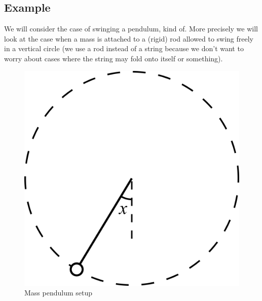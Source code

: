 \subsection{Example}
We will consider the case of swinging a pendulum, kind of. More precisely we will look at the case when a mass is attached to a (rigid) rod allowed to swing freely in a vertical circle (we use a rod instead of a string because we don't want to worry about cases where the string may fold onto itself or something). 

\begin{figure}[ht]
    \centering
    \includegraphics[scale=0.7]{Images/mass_pendulum_diagram.png}
    \caption{Mass pendulum setup}
    \label{fig:mass-pend-diagram}
\end{figure}

